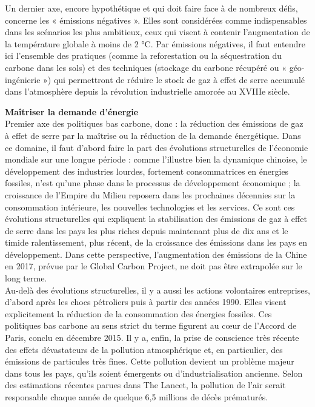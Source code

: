 \documentclass[8pt]{article}
\begin{document}
Un dernier axe, encore hypothétique et qui doit faire face à de nombreux défis, concerne les « émissions négatives ». Elles sont considérées comme indispensables dans les scénarios les plus ambitieux, ceux qui visent à contenir l’augmentation de la température globale à moins de 2 °C. Par émissions négatives, il faut entendre ici l’ensemble des pratiques (comme la reforestation ou la séquestration du carbone dans les sols) et des techniques (stockage du carbone récupéré ou « géo-ingénierie ») qui permettront de réduire le stock de gaz à effet de serre accumulé dans l’atmosphère depuis la révolution industrielle amorcée au XVIIIe siècle.

 \newpage


\textbf{Maîtriser la demande d’énergie}\\

Premier axe des politiques bas carbone, donc : la réduction des émissions de gaz à effet de serre par la maîtrise ou la réduction de la demande énergétique. Dans ce domaine, il faut d’abord faire la part des évolutions structurelles de l’économie mondiale sur une longue période : comme l’illustre bien la dynamique chinoise, le développement des industries lourdes, fortement consommatrices en énergies fossiles, n’est qu’une phase dans le processus de développement économique ; la croissance de l’Empire du Milieu reposera dans les prochaines décennies sur la consommation intérieure, les nouvelles technologies et les services.
Ce sont ces évolutions structurelles qui expliquent la stabilisation des émissions de gaz à effet de serre dans les pays les plus riches depuis maintenant plus de dix ans et le timide ralentissement, plus récent, de la croissance des émissions dans les pays en développement. Dans cette perspective, l’augmentation des émissions de la Chine en 2017, prévue par le Global Carbon Project, ne doit pas être extrapolée sur le long terme.\\


Au-delà des évolutions structurelles, il y a aussi les actions volontaires entreprises, d’abord après les chocs pétroliers puis à partir des années 1990. Elles visent explicitement la réduction de la consommation des énergies fossiles. Ces politiques bas carbone au sens strict du terme figurent au cœur de l’Accord de Paris, conclu en décembre 2015.
Il y a, enfin, la prise de conscience très récente des effets dévastateurs de la pollution atmosphérique et, en particulier, des émissions de particules très fines. Cette pollution devient un problème majeur dans tous les pays, qu’ils soient émergents ou d’industrialisation ancienne. Selon des estimations récentes parues dans The Lancet, la pollution de l’air serait responsable chaque année de quelque 6,5 millions de décès prématurés.\\
\end{document}
